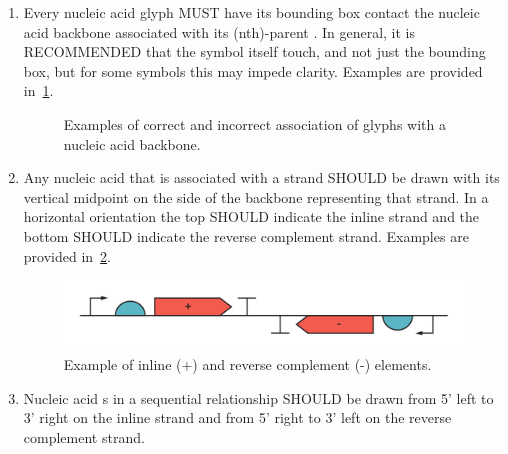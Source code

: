\begin{enumerate}
\item Every nucleic acid  glyph MUST have its bounding box contact the nucleic acid backbone associated with its (nth)-parent .  In general, it is RECOMMENDED that the symbol itself touch, and not just the bounding box, but for some symbols this may impede clarity.
	Examples are provided in~\ref{exa:2a}.
   	\begin{figure}[h!]
	\centering
	\caption{Examples of correct and incorrect association of glyphs with a nucleic acid backbone.}
	\label{exa:2a}
	\end{figure}
		
\item Any nucleic acid  that is associated with a strand SHOULD be drawn
	with its vertical midpoint on the side of the backbone representing that strand.
	In a horizontal orientation the top SHOULD indicate the inline strand and the bottom
	SHOULD indicate the reverse complement strand.
	Examples are provided in~\ref{exa:2b}.
	\begin{figure}[h!]
	\centering
	\includegraphics[width=6in]{figures/examples/2b.pdf}
	\caption{Example of inline (+) and reverse complement (-) elements.}
	\label{exa:2b}
	\end{figure} 

\item Nucleic acid s in a sequential relationship SHOULD be drawn from 5' left to 3' right on the inline strand and from 5' right to 3' left on the reverse complement strand.


\end{enumerate}

